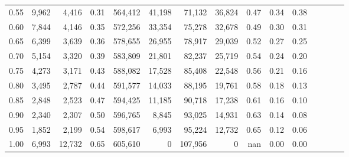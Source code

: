 \begin{tabular}{rrrcrrrrrrrrrrr}
0.55 &    9,962 &   4,416 &                                       0.31 &  564,412 &   41,198 &   71,132 &   36,824 &  0.47 &  0.34 &                         0.38 \\
0.60 &    7,844 &   4,146 &                                       0.35 &  572,256 &   33,354 &   75,278 &   32,678 &  0.49 &  0.30 &                         0.31 \\
0.65 &    6,399 &   3,639 &                                       0.36 &  578,655 &   26,955 &   78,917 &   29,039 &  0.52 &  0.27 &                         0.25 \\
0.70 &    5,154 &   3,320 &                                       0.39 &  583,809 &   21,801 &   82,237 &   25,719 &  0.54 &  0.24 &                         0.20 \\
0.75 &    4,273 &   3,171 &                                       0.43 &  588,082 &   17,528 &   85,408 &   22,548 &  0.56 &  0.21 &                         0.16 \\
0.80 &    3,495 &   2,787 &                                       0.44 &  591,577 &   14,033 &   88,195 &   19,761 &  0.58 &  0.18 &                         0.13 \\
0.85 &    2,848 &   2,523 &                                       0.47 &  594,425 &   11,185 &   90,718 &   17,238 &  0.61 &  0.16 &                         0.10 \\
0.90 &    2,340 &   2,307 &                                       0.50 &  596,765 &    8,845 &   93,025 &   14,931 &  0.63 &  0.14 &                         0.08 \\
0.95 &    1,852 &   2,199 &                                       0.54 &  598,617 &    6,993 &   95,224 &   12,732 &  0.65 &  0.12 &                         0.06 \\
1.00 &    6,993 &  12,732 &                                       0.65 &  605,610 &        0 &  107,956 &        0 &   nan &  0.00 &                         0.00 \\
\bottomrule
\end{tabular}
